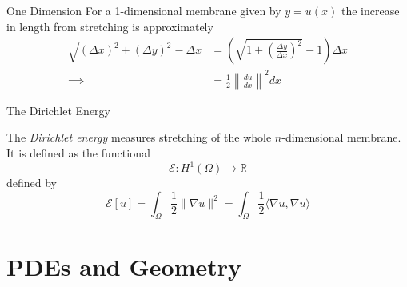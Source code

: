 \documentclass[usenames,dvipsnames]{beamer}
\theoremstyle{definition}
\theoremstyle{theorem}
\newcommand{\R}{\mathbb{R}}
\begin{document}
    \begin{frame}{One Dimension}
        For a 1-dimensional membrane given by $y=u(x)$ the increase in length from stretching is approximately
        \begin{align*}
            \sqrt{(\Delta x)^2+(\Delta y)^2}-\Delta x &= \left(\sqrt{1 + \left( \frac{\Delta y}{\Delta x}\right)^2} - 1\right)\Delta x\\
            \implies&= \frac{1}{2}\left\|\frac{du}{dx}\right\|^2dx
        \end{align*}
    \end{frame}


\begin{frame}{The Dirichlet Energy}
\begin{definition}
    The \emph{Dirichlet energy} measures stretching of the whole $n$-dimensional membrane. It is defined as the functional
    \[
    \mathcal{E}\colon H^1(\Omega) \to \R
    \]
    defined by
    \[
    \mathcal{E}[u]= \int_\Omega \frac{1}{2} \|\nabla u\|^2 = \int_\Omega \frac{1}{2} \langle \nabla u, \nabla u \rangle 
    \]
\end{definition}
\end{frame}
    
    
        
        

        
      
        
    
\section{PDEs and Geometry}
\end{document}
